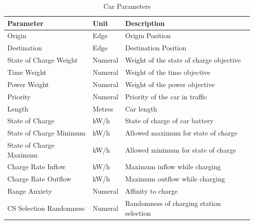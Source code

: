 	 \begin{table}[h]
	 	\renewcommand{\arraystretch}{1.3}
	 	\caption{Car Parameters}
	 	\centering
	 	\begin{tabular}{lll}
		 	\hline
			\textbf{Parameter}                    & \textbf{Unit} & \textbf{Description} \\ \hline
			Origin                                & Edge          & Origin Position      \\
			Destination                           & Edge          & Destination Position \\
			State of Charge Weight                & Numeral       & Weight of the state of charge objective                     \\
			Time Weight                           & Numeral       & Weight of the time objective                     \\
			Power Weight                          & Numeral       & Weight of the power objective                     \\
			Priority                              & Numeral       & Priority of the car in traffic                  \\
			Length                        	      & Metres        & Car length             \\
			State of Charge                       & kW/h          & State of charge of car battery                     \\
			State of Charge Minimum               & kW/h          & Allowed maximum for state of charge                    \\
			State of Charge Maximum               & kW/h          & Allowed minimum for state of charge                     \\
			Charge Rate Inflow                    & kW/h          & Maximum inflow while charging                     \\
			Charge Rate Outflow                   & kW/h          & Maximum outflow while charging                     \\
			Range Anxiety                         & Numeral       & Affinity to charge                     \\
			CS Selection Randomness 			  & Numeral       & Randomness of charging station selection                     \\ \hline
		\end{tabular}
	\end{table}
